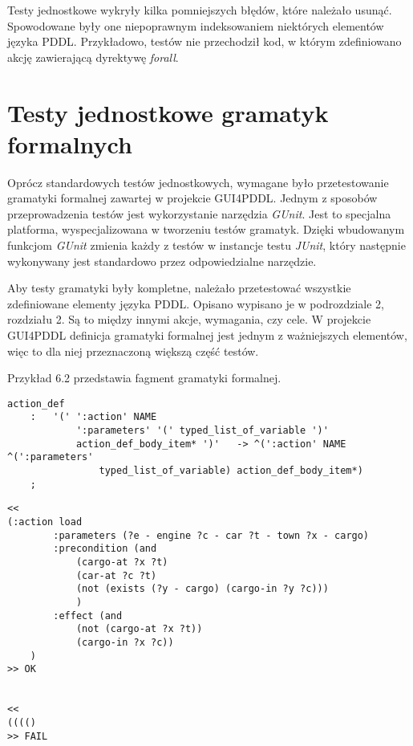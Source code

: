 Testy jednostkowe wykryły kilka pomniejszych błędów, które należało usunąć. Spowodowane były one niepoprawnym indeksowaniem niektórych elementów języka PDDL. Przykładowo, testów nie przechodził kod, w którym zdefiniowano akcję zawierającą dyrektywę \textit{forall}.
\section{Testy jednostkowe gramatyk formalnych}
Oprócz standardowych testów jednostkowych, wymagane było przetestowanie gramatyki formalnej zawartej w projekcie GUI4PDDL. Jednym z sposobów przeprowadzenia testów jest wykorzystanie narzędzia \textit{GUnit}. Jest to specjalna platforma, wyspecjalizowana w tworzeniu testów gramatyk. Dzięki wbudowanym funkcjom \textit{GUnit} zmienia każdy z testów w instancje testu \textit{JUnit}, który następnie wykonywany jest standardowo przez odpowiedzialne narzędzie.

Aby testy gramatyki były kompletne, należało przetestować wszystkie zdefiniowane elementy języka PDDL. Opisano wypisano je w podrozdziale 2, rozdziału 2. Są to między innymi akcje, wymagania, czy cele. W projekcie GUI4PDDL definicja gramatyki formalnej jest jednym z ważniejszych elementów, więc to dla niej przeznaczoną większą część testów.

Przykład 6.2 przedstawia fagment gramatyki formalnej.


\begin{Code}
\begin{lstlisting}[language=LISP,frame=single,label=ana_code, caption=Fragment gramatyki formalnej]
action_def 
	:	'(' ':action' NAME
			':parameters' '(' typed_list_of_variable ')'
			action_def_body_item* ')'   -> ^(':action' NAME ^(':parameters' 
				typed_list_of_variable)	action_def_body_item*) 
	;
\end{lstlisting}
\end{Code}

\begin{Code}
\begin{lstlisting}[language=LISP,frame=single,label=ana_code, caption=Przykładowe testy dla przykładu 6.2]
<<
(:action load
        :parameters (?e - engine ?c - car ?t - town ?x - cargo)
        :precondition (and
            (cargo-at ?x ?t)
            (car-at ?c ?t)
            (not (exists (?y - cargo) (cargo-in ?y ?c)))
            )
        :effect (and
            (not (cargo-at ?x ?t))
            (cargo-in ?x ?c))
    )
>> OK


<<
(((()
>> FAIL
\end{lstlisting}
\end{Code}

